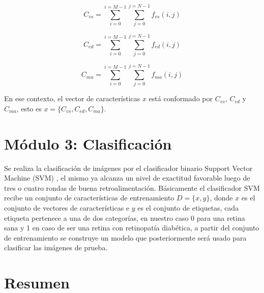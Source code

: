 \begin{equation}
\label{eq:AreaObjetoSeg1}
C_{vs}=\sum_{i=0}^{i=M-1} \sum_{j=0}^{j=N-1} f_{vs}(i,j)
\end{equation}



\begin{equation}
\label{eq:AreaObjetoSeg2}
C_{ed}=\sum_{i=0}^{i=M-1} \sum_{j=0}^{j=N-1} f_{ed}(i,j)
\end{equation}

\begin{equation}
\label{eq:AreaObjetoSeg3}
C_{ma}=\sum_{i=0}^{i=M-1} \sum_{j=0}^{j=N-1} f_{ma}(i,j)
\end{equation}

En ese contexto, el vector de características $x$ está conformado por $C_{vs}$, $C_{ed}$ y $C_{ma}$, esto es $x=\{C_{vs},C_{ed},C_{ma}\}$.

\section{Módulo 3: Clasificación}
Se realiza la clasificación de imágenes por el clasificador binario Support Vector Machine (SVM) \cite{cortes1995support}, el mismo ya alcanza un nivel de  exactitud favorable luego de tres o cuatro rondas de buena retroalimentación. Básicamente el clasificador SVM recibe un conjunto de características de entrenamiento $D=\{x,y\}$, donde $x$ es el conjunto de vectores de características e $y$ es el conjunto de etiquetas, cada etiqueta pertenece a una de dos categorías, en nuestro caso 0 para una retina sana y 1 en caso de ser una retina con retinopatía diabética, a partir del conjunto de entrenamiento se construye un modelo que posteriormente será usado para clasificar las imágenes de prueba.%


\section{Resumen}


